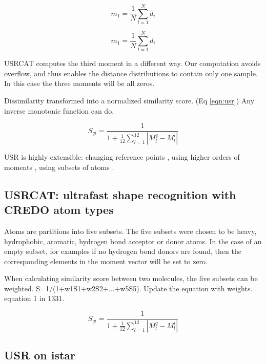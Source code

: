 \begin{equation}
m_1=\frac{1}{N}\sum_{l=1}^{N}d_i
\label{eqn:moment2}
\end{equation}

\begin{equation}
m_1=\frac{1}{N}\sum_{l=1}^{N}d_i
\label{eqn:moment3}
\end{equation}

USRCAT computes the third moment in a different way. Our computation avoids overflow, and thus enables the distance distributions to contain only one sample. In this case the three moments will be all zeros.

Dissimilarity transformed into a normalized similarity score. (Eq \ref{eqn:usr}) Any inverse monotonic function can do.

\begin{equation}
S_{qi}=\frac{1}{1+\frac{1}{12}\sum_{l=1}^{12}|M_l^q-M_l^i|}
\label{eqn:usr}
\end{equation}

USR is highly extensible: changing reference points \citep{1334,1335}, using higher orders of moments \citep{1333,1337}, using subsets of atoms \citep{1436,1331}.

\subsection{USRCAT: ultrafast shape recognition with CREDO atom types}

Atoms are partitions into five subsets. The five subsets were chosen to be heavy, hydrophobic, aromatic, hydrogen bond acceptor or donor atoms.%
In the case of an empty subset, for examples if no hydrogen bond donors are found, then the corresponding elements in the moment vector will be set to zero.

When calculating similarity score between two molecules, the five subsets can be weighted. S=1/(1+w1S1+w2S2+...+w5S5). Update the equation with weights. equation 1 in {1331}.

\begin{equation}
S_{qi}=\frac{1}{1+\frac{1}{12}\sum_{l=1}^{12}|M_l^q-M_l^i|}
\label{eqn:usrcat}
\end{equation}

\subsection{USR on istar}

